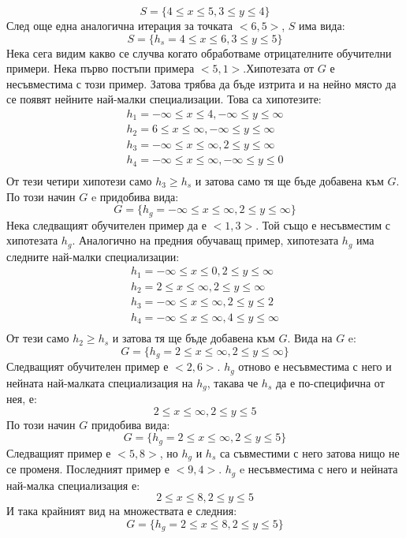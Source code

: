 \documentclass{article}
\begin{document}
\begin{enumerate}
\[S = \{4 \leq x \leq 5, 3 \leq y \leq 4\}\]
След още една аналогична итерация за точката $<6, 5>$, $S$ има вида:
\[S = \{h_s = 4 \leq x \leq 6, 3 \leq y \leq 5\}\]
Нека сега видим какво се случва когато обработваме отрицателните обучителни примери.
Нека първо постъпи примера $<5, 1>$.Хипотезата от $G$ е несъвместима с този пример. Затова трябва да бъде изтрита и на нейно място да се появят нейните най-малки специализации.
Това са хипотезите:
\[
	\begin{array}{lr}
		h_1 = -\infty \leq x \leq 4, -\infty \leq y \leq \infty\\
		h_2 = 6 \leq x \leq \infty, -\infty \leq y \leq \infty\\
		h_3 = -\infty \leq x \leq \infty, 2 \leq y \leq \infty\\
		h_4 = -\infty \leq x \leq \infty, -\infty \leq y \leq 0\\
	\end{array}
\]
От тези четири хипотези само $h_3 \geq h_s$ и затова само тя ще бъде добавена към $G$. По този начин $G$ e придобива вида:
\[G = \{h_g = -\infty \leq x \leq \infty, 2 \leq y \leq \infty\}\]
Нека следващият обучителен пример да е $<1, 3>$. Той също е несъвместим с хипотезата $h_g$. Аналогично на предния обучаващ пример, хипотезата $h_g$ има следните най-малки специализации:
\[
	\begin{array}{lr}
		h_1 = -\infty \leq x \leq 0, 2 \leq y \leq \infty\\
		h_2 = 2 \leq x \leq \infty, 2 \leq y \leq \infty\\
		h_3 = -\infty \leq x \leq \infty, 2 \leq y \leq 2\\
		h_4 = -\infty \leq x \leq \infty, 4 \leq y \leq \infty\\
	\end{array}
\]
От тези само $h_2 \geq h_s$ и затова тя ще бъде добавена към $G$. Вида на $G$ e:
\[G = \{h_g = 2 \leq x \leq \infty, 2 \leq y \leq \infty\}\]
Следващият обучителен пример е $<2, 6>$. $h_g$ отново е несъвместима с него и нейната най-малката специализация на $h_g$, такава че $h_s$ да е по-специфична от нея, е:
\[2 \leq x \leq \infty, 2 \leq y \leq 5\]
По този начин $G$ придобива вида:
\[G = \{h_g = 2 \leq x \leq \infty, 2 \leq y \leq 5\}\]
Следващият пример е $<5, 8>$, но $h_g$ и $h_s$ са съвместими с него затова нищо не се променя.
Последният пример е $<9, 4>$. $h_g$ e несъвместима с него и нейната най-малка специализация е:
\[2 \leq x \leq 8, 2 \leq y \leq 5\]
И така крайният вид на множествата е следния:
\[G = \{h_g = 2 \leq x \leq 8, 2 \leq y \leq 5\}\]

\end{enumerate}
\end{document}
